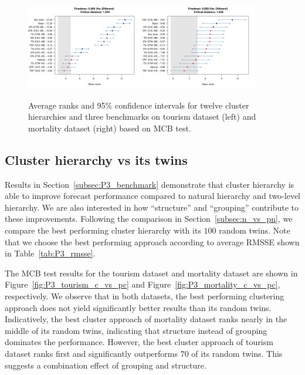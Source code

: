 \documentclass[a4paper,review,12pt,authoryear]{elsarticle}
\begin{document}
\begin{figure}
    \centering
    \includegraphics[width=0.45\textwidth]{figures/hierarchy_rmsse/tourism/P3_mcb_benchmarks_h12.pdf}
    \includegraphics[width=0.45\textwidth]{figures/hierarchy_rmsse/mortality/P3_mcb_benchmarks_h12.pdf}
    \caption{\label{fig:P3_mcb_benchmark}Average ranks and 95\% confidence intervals for twelve cluster hierarchies and three benchmarks on tourism dataset (left) and mortality dataset (right) based on MCB test.}
\end{figure}


\subsection{Cluster hierarchy vs its twins}
\label{subsec:P3_c_vs_pc}

Results in Section~\ref{subsec:P3_benchmark} demonstrate that cluster hierarchy is able to improve forecast performance compared to natural hierarchy and two-level hierarchy. 
We are also interested in how ``structure'' and ``grouping'' contribute to these improvements. Following the comparison in Section~\ref{subsec:n_vs_pn}, we compare the best performing cluster hierarchy with its $100$ random twins. 
Note that we choose the best performing approach according to average RMSSE shown in Table~\ref{tab:P3_rmsse}.

The MCB test results for the tourism dataset and mortality dataset are shown in Figure~\ref{fig:P3_tourism_c_vs_pc} and Figure~\ref{fig:P3_mortality_c_vs_pc}, respectively.
We observe that in both datasets, the best performing clustering approach does not yield significantly better results than its random twins. 
Indicatively, the best cluster approach of mortality dataset ranks nearly in the middle of its random twins, indicating that structure instead of grouping dominates the performance. 
However, the best cluster approach of tourism dataset ranks first and significantly outperforms $70$ of its random twins. This suggests a combination effect of grouping and structure.
\end{document}
